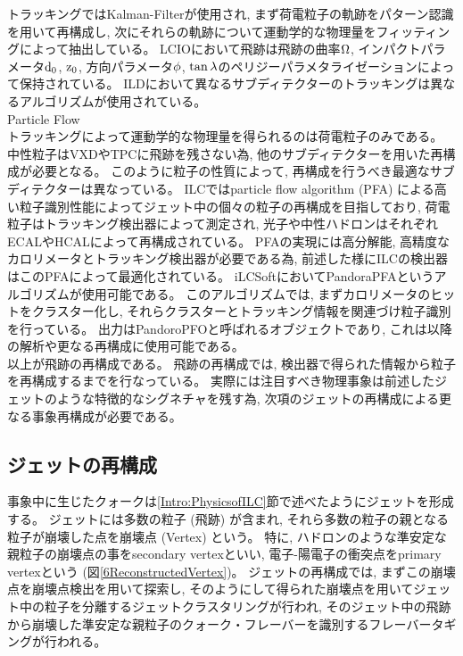 トラッキングではKalman-Filterが使用され, まず荷電粒子の軌跡をパターン認識を用いて再構成し, 次にそれらの軌跡について運動学的な物理量をフィッティングによって抽出している。
LCIOにおいて飛跡は飛跡の曲率$\rm \Omega$, インパクトパラメータ$\rm d_0$, $\rm z_0$, 方向パラメータ$\rm \phi$, $\rm \tan{\lambda}$のペリジーパラメタライゼーションによって保持されている。
ILDにおいて異なるサブディテクターのトラッキングは異なるアルゴリズムが使用されている。\\

Particle Flow\\

トラッキングによって運動学的な物理量を得られるのは荷電粒子のみである。
中性粒子はVXDやTPCに飛跡を残さない為, 他のサブディテクターを用いた再構成が必要となる。
このように粒子の性質によって, 再構成を行うべき最適なサブディテクターは異なっている。
ILCではparticle flow algorithm (PFA) による高い粒子識別性能によってジェット中の個々の粒子の再構成を目指しており, 荷電粒子はトラッキング検出器によって測定され, 光子や中性ハドロンはそれぞれECALやHCALによって再構成されている。
PFAの実現には高分解能, 高精度なカロリメータとトラッキング検出器が必要である為, 前述した様にILCの検出器はこのPFAによって最適化されている。
iLCSoftにおいてPandoraPFAというアルゴリズムが使用可能である。
このアルゴリズムでは, まずカロリメータのヒットをクラスター化し, それらクラスターとトラッキング情報を関連づけ粒子識別を行っている。
出力はPandoroPFOと呼ばれるオブジェクトであり, これは以降の解析や更なる再構成に使用可能である。\\

以上が飛跡の再構成である。
飛跡の再構成では, 検出器で得られた情報から粒子を再構成するまでを行なっている。
実際には注目すべき物理事象は前述したジェットのような特徴的なシグネチャを残す為, 次項のジェットの再構成による更なる事象再構成が必要である。


\subsection{ジェットの再構成} \label{Intro:SoftERILC:JetReconstruction}

事象中に生じたクォークは\ref{Intro:PhysicsofILC}節で述べたようにジェットを形成する。
ジェットには多数の粒子 (飛跡) が含まれ, それら多数の粒子の親となる粒子が崩壊した点を崩壊点 (Vertex) という。
特に, ハドロンのような準安定な親粒子の崩壊点の事をsecondary vertexといい, 電子-陽電子の衝突点をprimary vertexという (図\ref{6ReconstructedVertex})。
ジェットの再構成では, まずこの崩壊点を崩壊点検出を用いて探索し, そのようにして得られた崩壊点を用いてジェット中の粒子を分離するジェットクラスタリングが行われ, そのジェット中の飛跡から崩壊した準安定な親粒子のクォーク・フレーバーを識別するフレーバータギングが行われる。

